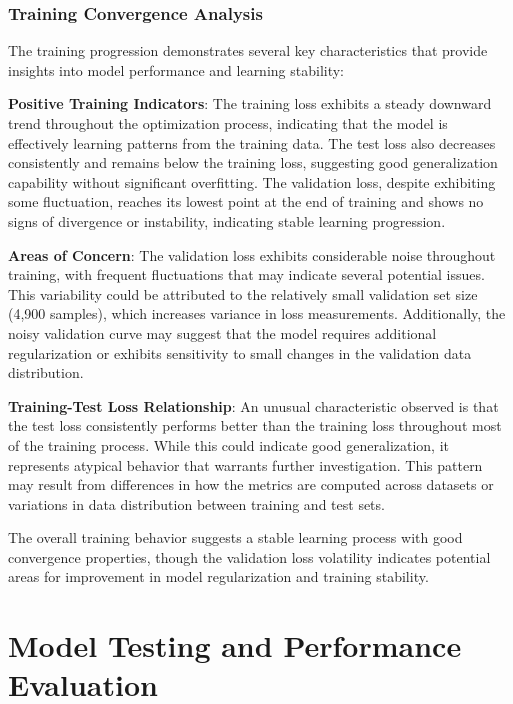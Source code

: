 \subsubsection{Training Convergence Analysis}
\label{subsubsec:training_convergence}

The training progression demonstrates several key characteristics that provide insights into model performance and learning stability:

\textbf{Positive Training Indicators}: The training loss exhibits a steady downward trend throughout the optimization process, indicating that the model is effectively learning patterns from the training data. The test loss also decreases consistently and remains below the training loss, suggesting good generalization capability without significant overfitting. The validation loss, despite exhibiting some fluctuation, reaches its lowest point at the end of training and shows no signs of divergence or instability, indicating stable learning progression.

\textbf{Areas of Concern}: The validation loss exhibits considerable noise throughout training, with frequent fluctuations that may indicate several potential issues. This variability could be attributed to the relatively small validation set size (4,900 samples), which increases variance in loss measurements. Additionally, the noisy validation curve may suggest that the model requires additional regularization or exhibits sensitivity to small changes in the validation data distribution.

\textbf{Training-Test Loss Relationship}: An unusual characteristic observed is that the test loss consistently performs better than the training loss throughout most of the training process. While this could indicate good generalization, it represents atypical behavior that warrants further investigation. This pattern may result from differences in how the metrics are computed across datasets or variations in data distribution between training and test sets.

The overall training behavior suggests a stable learning process with good convergence properties, though the validation loss volatility indicates potential areas for improvement in model regularization and training stability.

\section{Model Testing and Performance Evaluation}
\label{sec:model_testing}

